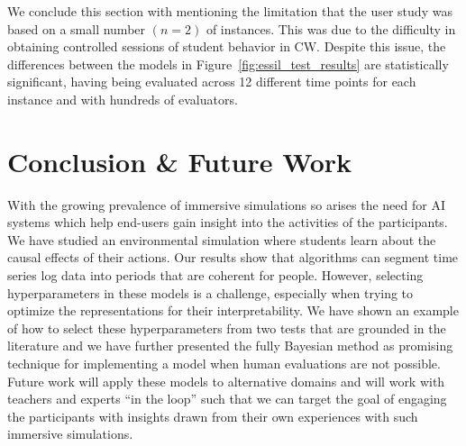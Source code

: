 \documentclass[letterpaper]{article}
\begin{document}
We conclude this section with mentioning the limitation that the user study was based on a small number $(n=2)$  of instances. This was due to the difficulty in obtaining controlled sessions of student behavior in CW. Despite this issue, the differences between the models in Figure~\ref{fig:essil_test_results} are statistically significant, having being evaluated across 12 different time points for each instance and with hundreds of evaluators.

























\vspace{-0.75mm}
\section{Conclusion \& Future Work}


With the growing prevalence of immersive simulations so arises the need for AI systems which help end-users gain insight into the activities of the participants.
We have studied an environmental simulation where students learn about the causal effects of their actions.
Our results show that algorithms can segment time series log data into periods that are coherent for people.
However, selecting hyperparameters in these models is a challenge, especially when trying to optimize the representations for their interpretability.
We have shown an example of how to select these hyperparameters from two tests that are grounded in the literature and we have further presented the fully Bayesian method as promising technique for implementing a model when human evaluations are not possible.
Future work will apply these models to alternative domains and will work with teachers and experts ``in the loop'' such that we can target the goal of engaging the participants with insights drawn from their own experiences with such immersive simulations.
\end{document}
